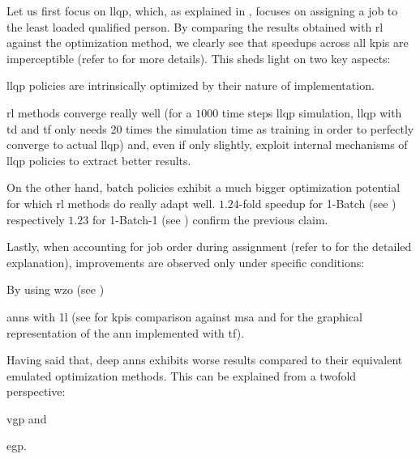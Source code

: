 Let us first focus on \gls{llqp}, which, as explained in , focuses on assigning a job to the least loaded qualified person. By comparing the results obtained with \gls{rl} against the optimization method, we clearly see that speedups across all \glspl{kpi} are imperceptible (refer to  for more details). This sheds light on two key aspects:
\begin{enumerate*}
	\item \gls{llqp} policies are intrinsically optimized by their nature of implementation.
	\item \gls{rl} methods converge really well (for a $1000$ time steps \gls{llqp} simulation, \gls{llqp} with \gls{td} and \gls{tf} only needs 20 times the simulation time as training in order to perfectly converge to actual \gls{llqp}) and, even if only slightly, exploit internal mechanisms of \gls{llqp} policies to extract better results.
\end{enumerate*}

On the other hand, batch policies exhibit a much bigger optimization potential for which \gls{rl} methods do really adapt well. $1.24$-fold speedup for 1-Batch (see ) respectively $1.23$ for 1-Batch-1 (see ) confirm the previous claim.

Lastly, when accounting for job order during assignment (refer to  for the detailed explanation), improvements are observed only under specific conditions:
\begin{enumerate*}
	\item By using \gls{wzo} (see ) 
	\item \glspl{ann} with \gls{1l} (see  for \glspl{kpi} comparison against \gls{msa} and  for the graphical representation of the \gls{ann} implemented with \gls{tf}).
\end{enumerate*}

Having said that, deep \glspl{ann} exhibits worse results compared to their equivalent emulated optimization methods. This can be explained from a twofold perspective:
\begin{enumerate*}
	\item \gls{vgp} and
	\item \gls{egp}.
\end{enumerate*}

